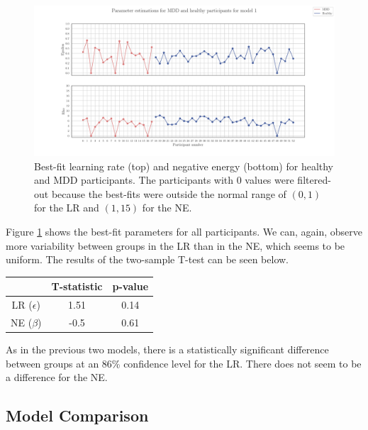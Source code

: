\documentclass[12pt]{article}
\newtheorem*{theorem}{Theorem}
\begin{document}
\begin{figure}[h!]
	\centering
	\hspace*{-0.6in}
	\includegraphics[width=1.1\linewidth]{figures/2.6.1.pdf}
	\caption{Best-fit learning rate (top) and negative energy (bottom) for healthy and MDD participants. The participants with 0 values were filtered-out because the best-fits were outside the normal range of $(0,1)$ for the LR and $(1, 15)$ for the NE.}
	\label{fig:2.6.2}
\end{figure}

Figure \ref{fig:2.6.2} shows the best-fit parameters for all participants. We can, again, observe more variability between groups in the LR than in the NE, which seems to be uniform. The results of the two-sample T-test can be seen below.

\begin{center}
 \begin{tabular}{|c || c | c |} 
 \hline
  & T-statistic & p-value  \\ [0.5ex] 
 \hline\hline
 LR ($\epsilon$) & 1.51 & 0.14 \\
 \hline
 NE ($\beta$) & -0.5 & 0.61 \\ [1ex] 
 \hline
\end{tabular}
\end{center}

As in the previous two models, there is a statistically significant difference between groups at an 86\% confidence level for the LR. There does not seem to be a difference for the NE.

\subsection{Model Comparison}





\newpage



\end{document}
